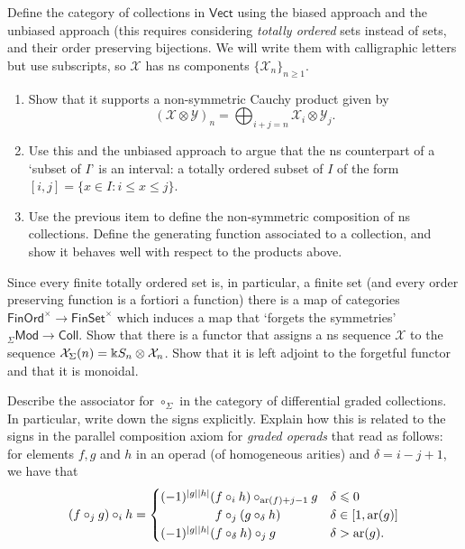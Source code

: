  \begin{question}
Define the category of collections
in $\mathsf{Vect}$
using the biased approach and the 
unbiased approach (this requires considering
\emph{totally ordered} sets instead of sets,
and their order preserving bijections. We will
write them with calligraphic letters but
use subscripts, so $\mathcal X$ has ns
components $\{\mathcal X_n\}_{n\geqslant 1}$.

\begin{enumerate}
\item Show
that it supports a non-symmetric Cauchy
product given by 
\[ (\mathcal{X}\otimes\mathcal{Y})_n =
  \bigoplus_{i+j=n} \mathcal{X}_i\otimes
   	\mathcal{Y}_j.\]
   	
   	\item Use this and the unbiased approach to 
   	argue that the ns counterpart of a
   	`subset of $I$' is an interval:
   	a totally ordered subset of $I$ of the
   	form $[i,j] = \{ x\in I : i\leqslant x \leqslant j\}$.
 \item Use the previous item to define the
 non-symmetric composition of ns collections.
 Define the generating function associated
 to a collection, and show it behaves
 well with respect to the products above. 
\end{enumerate}
\end{question}

\begin{question}
Since every finite totally ordered set
is, in particular, a finite set (and
every order preserving function is a
fortiori a function) there is a 
map of categories 
$ \mathsf{FinOrd}^\times \longrightarrow
 	\mathsf{FinSet}^\times$
which induces a map that `forgets the
symmetries' ${}_\Sigma\mathsf{Mod}	\longrightarrow\mathsf{Coll}$. 
Show that there is a functor that assigns
a ns sequence $\mathcal{X}$ to the 
sequence $\mathcal{X}_\Sigma(n) =
\Bbbk S_n\otimes \mathcal{X}_n$.  Show that it is
left adjoint to the forgetful functor and that it is monoidal. 
\end{question}
 
\begin{question}
Describe the associator for $\circ_\Sigma$ in the
category of differential graded collections. 
In particular,
write down the signs explicitly. Explain
how this is related to the signs
in the parallel composition axiom
for \emph{graded operads} that read as follows:
for elements $f,g$ and $h$
in an operad (of homogeneous arities)
and $\delta = i-j+1$, we have that
\[ 
(f \circ_j g) \circ_i h  = 
 	\begin{cases} 
 		(-1)^{|g||h|}
 		 (f \circ_i h) \circ_{\ari(f)+j-1} g
 		  	& \delta \leqslant 0  \\
 		 \phantom{(-1)^{|g||h|}(} 	f\circ_j (g \circ_\delta h) &
 		  	\delta\in [1,\ari(g)] \\
 		(-1)^{|g||h|}
   	(f \circ_\delta h) \circ_j g
   		 & \delta > \ari(g).
 		   \end{cases}
 		 \]
\end{question}

